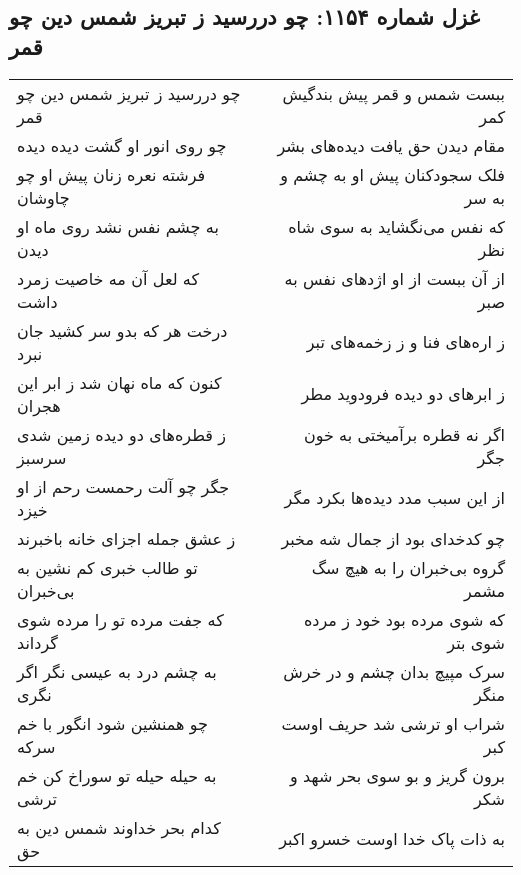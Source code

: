 \begin{center}
\section*{غزل شماره ۱۱۵۴: چو دررسید ز تبریز شمس دین چو قمر}
\label{sec:1154}
\begin{longtable}{l p{0.5cm} r}
چو دررسید ز تبریز شمس دین چو قمر
&&
ببست شمس و قمر پیش بندگیش کمر
\\
چو روی انور او گشت دیده دیده
&&
مقام دیدن حق یافت دیده‌های بشر
\\
فرشته نعره زنان پیش او چو چاوشان
&&
فلک سجودکنان پیش او به چشم و به سر
\\
به چشم نفس نشد روی ماه او دیدن
&&
که نفس می‌نگشاید به سوی شاه نظر
\\
که لعل آن مه خاصیت زمرد داشت
&&
از آن ببست از او اژدهای نفس به صبر
\\
درخت هر که بدو سر کشید جان نبرد
&&
ز اره‌های فنا و ز زخمه‌های تبر
\\
کنون که ماه نهان شد ز ابر این هجران
&&
ز ابرهای دو دیده فرودوید مطر
\\
ز قطره‌های دو دیده زمین شدی سرسبز
&&
اگر نه قطره برآمیختی به خون جگر
\\
جگر چو آلت رحمست رحم از او خیزد
&&
از این سبب مدد دیده‌ها بکرد مگر
\\
ز عشق جمله اجزای خانه باخبرند
&&
چو کدخدای بود از جمال شه مخبر
\\
تو طالب خبری کم نشین به بی‌خبران
&&
گروه بی‌خبران را به هیچ سگ مشمر
\\
که جفت مرده تو را مرده شوی گرداند
&&
که شوی مرده بود خود ز مرده شوی بتر
\\
به چشم درد به عیسی نگر اگر نگری
&&
سرک مپیچ بدان چشم و در خرش منگر
\\
چو همنشین شود انگور با خم سرکه
&&
شراب او ترشی شد حریف اوست کبر
\\
به حیله حیله تو سوراخ کن خم ترشی
&&
برون گریز و بو سوی بحر شهد و شکر
\\
کدام بحر خداوند شمس دین به حق
&&
به ذات پاک خدا اوست خسرو اکبر
\\
\end{longtable}
\end{center}
